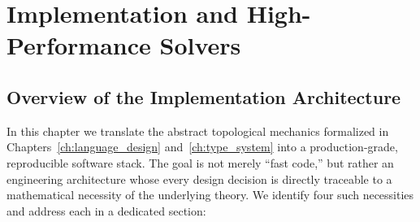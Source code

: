 \chapter{Implementation and High-Performance Solvers}
\label{ch:implementation}

\section{Overview of the Implementation Architecture}
\label{sec:impl_overview}

In this chapter we translate the abstract topological mechanics formalized in
Chapters~\ref{ch:language_design} and~\ref{ch:type_system} into a
production-grade, reproducible software stack.  The goal is not merely
``fast code,'' but rather an engineering architecture whose every design
decision is directly traceable to a mathematical necessity of the
underlying theory.  We identify four such necessities and address each in a
dedicated section:

